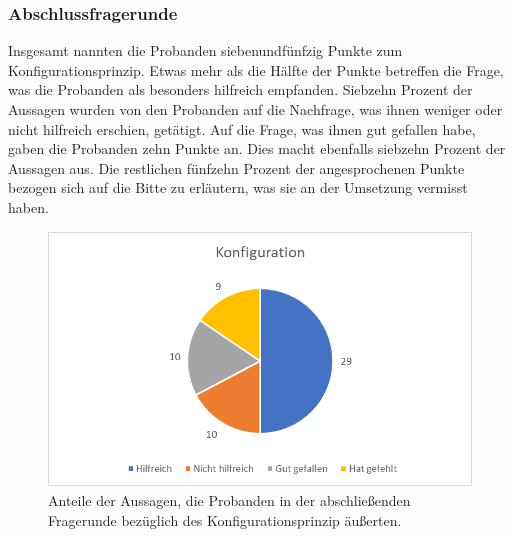 \subsubsection{Abschlussfragerunde}
Insgesamt nannten die Probanden siebenundfünfzig Punkte zum Konfigurationsprinzip. Etwas mehr als die Hälfte der Punkte betreffen die Frage, was die Probanden als besonders hilfreich empfanden. Siebzehn Prozent der Aussagen wurden von den Probanden auf die Nachfrage, was ihnen weniger oder nicht hilfreich erschien, getätigt. Auf die Frage, was ihnen gut gefallen habe, gaben die Probanden zehn Punkte an. Dies macht ebenfalls siebzehn Prozent der Aussagen aus. Die restlichen fünfzehn Prozent der angesprochenen Punkte bezogen sich auf die Bitte zu erläutern, was sie an der Umsetzung vermisst haben. 

\begin{figure}[h]
\centering
\includegraphics[width=1\textwidth]{pictures/diagramme/aussagenkonfig}
\caption{Anteile der Aussagen, die Probanden in der abschließenden Fragerunde bezüglich des Konfigurationsprinzip äußerten.}
\label{aussagenkonfig}
\end{figure}


